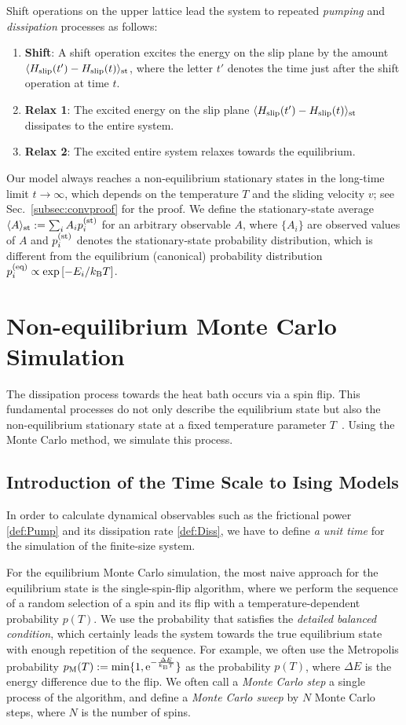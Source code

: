 Shift operations on the upper lattice lead the system to repeated \textit{pumping} and \textit{dissipation} processes as follows:
\begin{enumerate}
	\item \textbf{Shift}: A shift operation excites the energy on the slip plane by the amount $\langle H_{\rm slip}(t')-H_{\rm slip}(t)\rangle_{\rm st}$, where the letter $t'$ denotes the time just after the shift operation at time $t$.
	\item \textbf{Relax 1}: The excited energy on the slip plane $\langle H_{\rm slip}(t')-H_{\rm slip}(t)\rangle_{\rm st}$ dissipates to the entire system.
	\item \textbf{Relax 2}: The excited entire system relaxes towards the equilibrium.
\end{enumerate}
Our model always reaches a non-equilibrium stationary states in the long-time limit $t\to\infty$, which depends on the temperature $T$ and the sliding velocity $v$; see Sec.~\ref{subsec:convproof} for the proof. We define the stationary-state average $\langle A\rangle_{\rm st}:=\sum_{i}A_{i}p^{(\rm st)}_{i}$ for an arbitrary observable $A$, where $\{A_{i}\}$ are observed values of $A$ and $p^{(\rm st)}_{i}$ denotes the stationary-state probability distribution, which is different from the equilibrium (canonical) probability distribution $p^{(\rm eq)}_{i}\propto\exp\left[-E_{i}/k_{\rm B} T\right]$.

\section{Non-equilibrium Monte Carlo Simulation}
The dissipation process towards the heat bath occurs via a spin flip. This fundamental processes do not only describe the equilibrium state but also the non-equilibrium stationary state at a fixed temperature parameter $T$~\cite{Glauber1963}. Using the Monte Carlo method, we simulate this process.

\subsection{Introduction of the Time Scale to Ising Models}
In order to calculate dynamical observables such as the frictional power \eqref{def:Pump} and its dissipation rate \eqref{def:Diss}, we have to define \textit{a unit time} for the simulation of the finite-size system. 

For the equilibrium Monte Carlo simulation, the most naive approach for the equilibrium state is the single-spin-flip algorithm, where we perform the sequence of a random selection of a spin and its flip with a temperature-dependent probability $p(T)$. We use the probability that satisfies the \textit{detailed balanced condition}, which certainly leads the system towards the true equilibrium state with enough repetition of the sequence. For example, we often use the Metropolis probability $p_{\rm M}(T):=\min\{1,\mathrm{e}^{-\frac{\Delta E}{k_{\rm B}T}}\}$ as the probability $p(T)$, where $\Delta E$ is the energy difference due to the flip. We often call a \textit{Monte Carlo step} a single process of the algorithm, and define a \textit{Monte Carlo sweep} by $N$ Monte Carlo steps, where $N$ is the number of spins.

